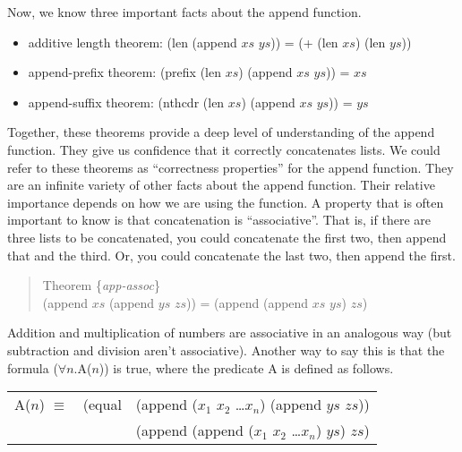 Now, we know three important facts about the append function.
\begin{itemize}
\item additive length theorem: (len (append $xs$ $ys$)) = (+ (len $xs$) (len $ys$))
\item append-prefix theorem: (prefix (len $xs$) (append $xs$ $ys$)) = $xs$
\item append-suffix theorem: (nthcdr (len $xs$) (append $xs$ $ys$)) = $ys$
\end{itemize}

Together, these theorems provide a deep level of understanding of the append function. They give us confidence that it correctly concatenates lists. We could refer to these theorems as ``correctness properties'' for the append function. They are an infinite variety of other facts about the append function. Their relative importance depends on how we are using the function. A property that is often important to know is that concatenation is ``associative''. That is, if there are three lists to be concatenated, you could concatenate the first two, then append that and the third. Or, you could concatenate the last two, then append the first.

\begin{quote}
\label{app-assoc}
Theorem \{\emph{app-assoc}\} \\
(append $xs$ (append $ys$ $zs$)) = (append (append $xs$ $ys$) $zs$)
\end{quote}

Addition and multiplication of numbers are associative in an analogous way (but subtraction and division aren't associative). Another way to say this is that the formula ($\forall$$n$.A($n$)) is true, where the predicate A is defined as follows.

\begin{center}
\begin{tabular} {lll}
A($n$) $\equiv$  & (equal & (append ($x_1$ $x_2$ \dots $x_n$) (append $ys$ $zs$)) \\
                 &        & (append (append ($x_1$ $x_2$ \dots $x_n$) $ys$) $zs$) \\
\end{tabular}
\end{center}

